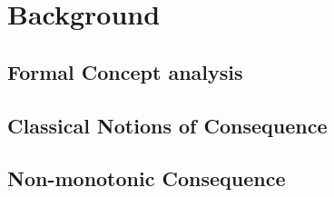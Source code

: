 \section{Background}
\label{section: background}
\subsection{Formal Concept analysis}
\label{subsection: formal concept analysis}

\subsection{Classical Notions of Consequence}
\label{subsection: classical notions of consequence}

\subsection{Non-monotonic Consequence}
\label{subsection: non-monotonic consequence}